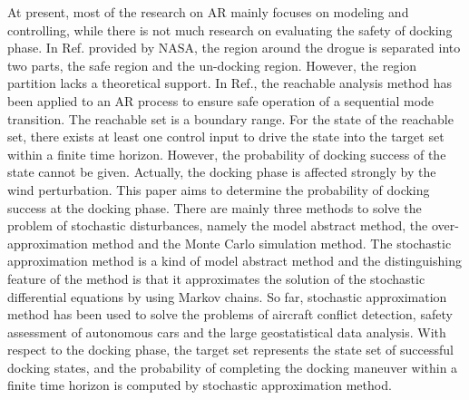 At present, most of the research on AR mainly focuses on modeling \cite{dai2016modeling,wang2016modeling,wang2017approach} and controlling\cite{wang2017drogue,wei2016drogue}, while there is not much research on evaluating the safety of docking phase. In Ref.\cite{dibley2007autonomous} provided by NASA, the region around the drogue is separated into two parts, the safe region and the un-docking region. However, the region partition lacks a theoretical support. In Ref.\cite{ding2012reachability}, the reachable analysis method has been applied to an AR process to ensure safe operation of a sequential mode transition. The reachable set is a boundary range. For the state of the reachable set, there exists at least one control input to drive the state into the target set within a finite time horizon. However, the probability of docking success of the state cannot be given. Actually, the docking phase is affected strongly by the wind perturbation. This paper aims to determine the probability of docking success at the docking phase. There are mainly three methods to solve the problem of stochastic disturbances, namely the model abstract method\cite{sinha1971stochastic,zhao2017health,kushner1990numerical}, the over-approximation method\cite{chutinan2003computational,stursberg2003efficient,kurzhanskiy2007ellipsoidal} and the Monte Carlo simulation method\cite{turati2016advanced,margellos2013toward}. The stochastic approximation method is a kind of model abstract method and the distinguishing feature of the method is that it approximates the solution of the stochastic differential equations by using Markov chains. So far, stochastic approximation method has been used to solve the problems of aircraft conflict detection\cite{prandini2006stochastic}, safety assessment of autonomous cars\cite{althoff2010reachability} and the large geostatistical data analysis\cite{liang2013resampling}. With respect to the docking phase, the target set represents the state set of successful docking states, and the probability of completing the docking maneuver within a finite time horizon is computed by stochastic approximation method\cite{sinha1971stochastic}.

